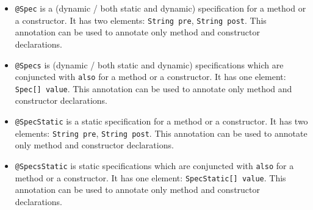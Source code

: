 \documentclass{article}
\begin{document}
\begin{itemize}
\item \texttt{@Spec} is a (dynamic / both static and dynamic) specification for a method or a constructor. It has two elements: \texttt{String pre}, \texttt{String post}. This annotation can be used to annotate only method and constructor declarations.
\item \texttt{@Specs} is (dynamic / both static and dynamic) specifications which are conjuncted with \texttt{also} for a method or a constructor. It has one element: \texttt{Spec[] value}. This annotation can be used to annotate only method and constructor declarations.
\item \texttt{@SpecStatic} is a static specification for a method or a constructor. It has two elements: \texttt{String pre}, \texttt{String post}. This annotation can be used to annotate only method and constructor declarations.
\item \texttt{@SpecsStatic} is static specifications which are conjuncted with \texttt{also} for a method or a constructor. It has one element: \texttt{SpecStatic[] value}. This annotation can be used to annotate only method and constructor declarations.
\end{itemize}
\end{document}
